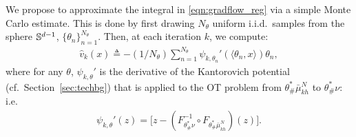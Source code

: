 We propose to approximate the integral in \eqref{eqn:gradflow_reg} via a simple Monte Carlo estimate.
%
This is done by first drawing $N_\theta$ uniform i.i.d.\ samples from the sphere $\mathbb{S}^{d-1}$, $\{\theta_{n}\}_{n=1}^{N_\theta}$. Then, at each iteration $k$, we compute:
%
\begin{align}
\hat{v}_k(x) \triangleq - (1/{N_\theta}) \sum\nolimits_{n=1}^{N_\theta} \psi_{k, \theta_{n}}'(\langle\theta_{n},x\rangle ) \theta_{n}, \label{eqn:approxdrift}
\end{align}
%
where for any $\theta$, $\psi_{k, \theta}'$ is the derivative of the Kantorovich potential (cf.\ Section~\ref{sec:techbg}) that is applied to the OT problem from $\theta^*_\#\bar{\mu}_{kh}^{N}$ to $\theta^*_\#\nu$: i.e.\,
\begin{align}
   \psi_{k, \theta}'(z) = \bigl[ z - (F^{-1}_{\theta^*_\#\nu} \circ F_{\theta^*_\#\bar{\mu}_{kh}^{N}}) (z)  \bigr] \label{eq:psiprime}.%
 \end{align}

